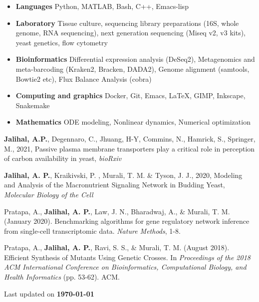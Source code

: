 \begin{itemize}
\item \textbf{Languages} Python, MATLAB,  Bash, C++, Emacs-lisp
\item \textbf{Laboratory} Tissue culture, sequencing library preparations (16S, whole genome, RNA sequencing), next generation sequencing (Miseq v2, v3 kits), yeast genetics, flow cytometry
\item \textbf{Bioinformatics} Differential expression analysis (DeSeq2), Metagenomics and meta-barcoding (Kraken2, Bracken, DADA2), Genome alignment (samtools, Bowtie2 etc), Flux Balance Analysis (cobra)
\item \textbf{Computing and graphics} Docker, Git, Emacs, \LaTeX, GIMP, Inkscape, Snakemake
\item \textbf{Mathematics} ODE modeling, Nonlinear dynamics, Numerical optimization
\end{itemize}

\begin{etaremune}
\item \textbf{Jalihal, A.P.}, Degennaro, C., Jhuang, H-Y, Commins, N., Hamrick, S., Springer, M., 2021, Passive plasma membrane transporters play a critical role in
perception of carbon availability in yeast, \textit{bioRxiv}
\item \textbf{Jalihal, A. P.}, Kraikivski, P. , Murali, T. M. \& Tyson, J. J., 2020, Modeling and Analysis of the Macronutrient Signaling Network in Budding Yeast, \textit{Molecular Biology of the Cell}
\item Pratapa, A., \textbf{Jalihal, A. P.}, Law, J. N., Bharadwaj, A., \& Murali, T. M. (January 2020). Benchmarking algorithms for gene regulatory network inference from single-cell transcriptomic data. \textit{Nature Methods}, 1-8.
\item Pratapa, A., \textbf{Jalihal, A. P.}, Ravi, S. S., \& Murali, T. M. (August 2018). Efficient Synthesis of Mutants Using Genetic Crosses. In \textit{Proceedings of the 2018 ACM International Conference on Bioinformatics, Computational Biology, and Health Informatics} (pp. 53-62). ACM.
\end{etaremune}
\vfill
\begin{center}
Last updated on \textbf{\today}  
\end{center}




